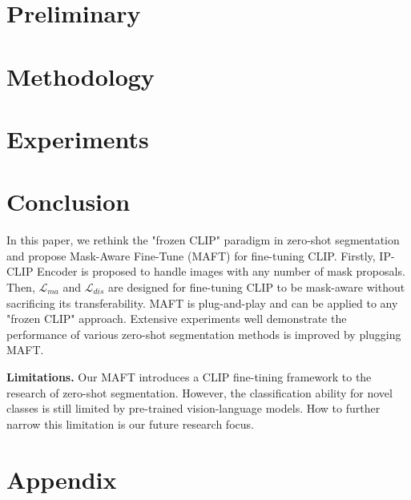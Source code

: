 \documentclass{article}
\begin{document}
\section{Preliminary}
\label{sec:prelimiary}


\section{Methodology}
\label{sec:method}


\section{Experiments}
\label{sec:exp}



\section{Conclusion}
In this paper, we rethink the "frozen CLIP" paradigm in zero-shot segmentation and propose Mask-Aware Fine-Tune (MAFT) for fine-tuning CLIP. 
Firstly, IP-CLIP Encoder is proposed to handle images with any number of mask proposals. Then, $\mathcal{L}_{ma}$ and $\mathcal{L}_{dis}$ are designed for fine-tuning CLIP to be mask-aware without sacrificing its transferability. MAFT is plug-and-play and can be applied to any "frozen CLIP" approach. Extensive experiments well demonstrate the performance of various zero-shot segmentation methods is improved by plugging MAFT.

\textbf{Limitations.}
Our MAFT introduces a CLIP fine-tining framework to the research of zero-shot segmentation. However, the classification ability for novel classes is still limited by pre-trained vision-language models. How to further narrow this limitation is our future research focus.



\newpage

\appendix
\section*{Appendix}


\newpage



\end{document}
